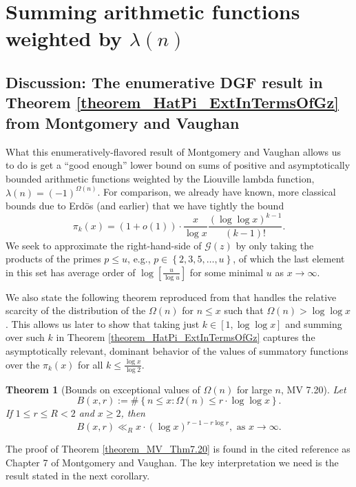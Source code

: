 \documentclass[11pt,reqno,a4letter]{article}
\numberwithin{figure}{section}
\numberwithin{table}{section}
\theoremstyle{plain}
\newtheorem{theorem}{Theorem}
\numberwithin{theorem}{section}
\theoremstyle{definition}
\begin{document}
\newpage 
\section{Summing arithmetic functions weighted by $\lambda(n)$} 
\label{Section_MVCh7_GzBounds} 
        
\subsection{Discussion: The enumerative DGF result in Theorem \ref{theorem_HatPi_ExtInTermsOfGz} from 
            Montgomery and Vaughan} 

What this enumeratively-flavored result of Montgomery and Vaughan allows us to do is get a 
``good enough'' lower bound on sums of positive and asymptotically bounded arithmetic functions 
weighted by the Liouville lambda function, $\lambda(n) = (-1)^{\Omega(n)}$. 
For comparison, we already have known, more classical bounds due to Erd\"os (and earlier) that 
we have tightly the bound \cite{ERDOS-PRIMEK-FUNC,MV} 
\[
\pi_k(x) = (1 + o(1)) \cdot \frac{x}{\log x} \frac{(\log\log x)^{k-1}}{(k-1)!}. 
\] 
We seek to approximate the right-hand-side of $\mathcal{G}(z)$ by only taking the products of the primes 
$p \leq u$, e.g., $p \in \left\{2,3,5,\ldots,u\right\}$, of which the last element in this set 
has average order of $\log\left[\frac{u}{\log u}\right]$ for some minimal $u$ as $x \rightarrow \infty$. 

We also state the following theorem reproduced from \cite[Thm.\ 7.20]{MV} that handles the relative 
scarcity of the distribution of the $\Omega(n)$ for $n \leq x$ such that 
$\Omega(n) > \log\log x$. This allows us later to show that taking just $k \in [1, \log\log x]$ 
and summing over such $k$ in Theorem \ref{theorem_HatPi_ExtInTermsOfGz} captures the asymptotically relevant, dominant 
behavior of the values of summatory functions over the $\pi_k(x)$ for all 
$k \leq \frac{\log x}{\log 2}$. 

\begin{theorem}[Bounds on exceptional values of $\Omega(n)$ for large $n$, MV 7.20] 
\label{theorem_MV_Thm7.20-init_stmt} 
Let 
\[
B(x, r) := \#\left\{n \leq x: \Omega(n) \leq r \cdot \log\log x\right\}. 
\]
If $1 \leq r \leq R < 2$ and $x \geq 2$, then 
\[
B(x, r) \ll_R x \cdot (\log x)^{r-1-r \log r}, \text{ \ as\ } x \rightarrow \infty. 
\]
\end{theorem} 

The proof of Theorem \ref{theorem_MV_Thm7.20} 
is found in the cited reference as Chapter 7 of Montgomery and Vaughan. 
The key interpretation we need is the result stated in the next corollary. 
\end{document}

